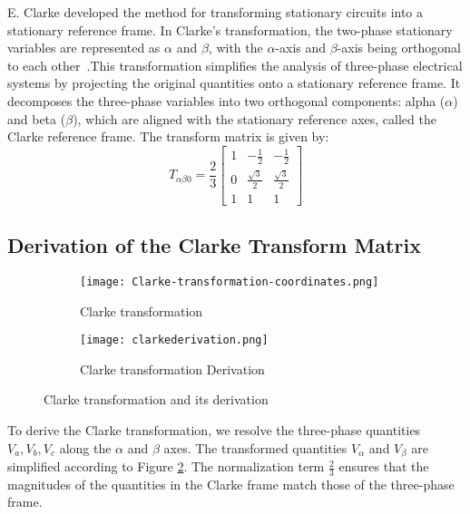 E. Clarke developed the method for transforming stationary circuits into a
stationary reference frame. In Clarke’s transformation, the two-phase
stationary variables are represented as $\alpha$ and $\beta$, with the
$\alpha$-axis and $\beta$-axis being orthogonal to each other~\cite{DSP-Based
    Electromechanical Motion Control}.This transformation simplifies the analysis
of three-phase electrical systems by projecting the original quantities onto a
stationary reference frame. It decomposes the three-phase variables into two
orthogonal components: alpha ($\alpha$) and beta ($\beta$), which are aligned
with the stationary reference axes, called the Clarke reference frame. The
transform matrix is given by:
\begin{equation*}
    T_{\alpha\beta0} = \frac{2}{3}
    \begin{bmatrix}
        1 & -\frac{1}{2}       & -\frac{1}{2}       \\
        0 & \frac{\sqrt{3}}{2} & \frac{\sqrt{3}}{2} \\
        1 & 1                  & 1
    \end{bmatrix}
\end{equation*}


\subsection{Derivation of the Clarke Transform Matrix}

\begin{figure}[h]
    \centering
    \begin{subfigure}[b]{0.5\textwidth}
        \centering
        \texttt{[image: Clarke-transformation-coordinates.png]}
        \caption{Clarke transformation}
        \label{fig:Clarke transformation}
    \end{subfigure}%
    \begin{subfigure}[b]{0.5\textwidth}
        \centering
        \texttt{[image: clarkederivation.png]}
        \caption{Clarke transformation Derivation}
        \label{fig:Clarke transformation Derivation}
    \end{subfigure}
    \caption{Clarke transformation and its derivation}
    \label{fig:combined_Clarke}
\end{figure}


To derive the Clarke transformation, we resolve the three-phase quantities \(
V_a, V_b, V_c \) along the \(\alpha\) and \(\beta\) axes. The transformed
quantities \( V_\alpha \) and \( V_\beta \) are simplified according to Figure
\ref{fig:Clarke transformation Derivation}. The normalization term \(
\frac{2}{3} \) ensures that the magnitudes of the quantities in the Clarke
frame match those of the three-phase frame.


